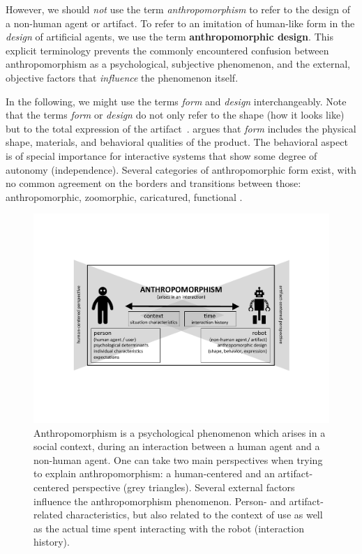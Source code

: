 \documentclass{frontiersSCNS} %
\begin{document}
However, we should \textit{not} use the term \emph{anthropomorphism} to refer to
the design of a non-human agent or artifact. To refer to an imitation of
human-like form in the \textit{design} of artificial agents, we use the term
\textbf{anthropomorphic design}. This explicit terminology prevents the commonly
encountered confusion between anthropomorphism as a psychological, subjective
phenomenon, and the external, objective factors that \emph{influence} the
phenomenon itself.

In the following, we might use the terms \emph{form} and \emph{design}
interchangeably. Note that the terms \textit{form} or {\it design} do not only
refer to the shape (how it looks like) but to the total expression of the
artifact~\citep{bartneck_shaping_2004}. \citet{disalvo_hug:_2003} argues that
\textit{form} includes the physical shape, materials, and behavioral qualities
of the product. The behavioral aspect is of special importance for interactive
systems that show some degree of autonomy (independence).  Several categories of
anthropomorphic form exist, with no common agreement on the borders and
transitions between those: anthropomorphic, zoomorphic, caricatured, functional
\citep{fong_survey_2003}.

\begin{figure}
    \centering
    \includegraphics[width=0.75\columnwidth]{anthropo.pdf}
    \caption{Anthropomorphism is a psychological phenomenon which arises in a
        social context, during an
    interaction between a human agent and a non-human agent. One can take two main perspectives when trying to explain
    anthropomorphism: a human-centered and an artifact-centered perspective (grey
    triangles). Several external factors influence the anthropomorphism
    phenomenon. Person- and artifact-related characteristics, but also related to the
context of use as well as the actual time spent interacting with the robot (interaction history).}

    \label{fig:anthropofig}
\end{figure}
\end{document}

